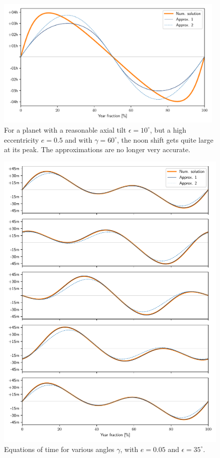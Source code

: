 \documentclass[12pt]{article}
\begin{document}
\begin{figure}[ht]
    \centering
    \includegraphics[width=0.98\textwidth]{./noon_computed_extreme.pdf}
    \caption{
        For a planet with a reasonable axial tilt $\epsilon=10^\circ$,
        but a high eccentricity $e=0.5$ and with $\gamma=60^\circ$, 
        the noon shift gets quite large at its peak. The approximations
        are no longer very accurate.
    }
    \label{fig:noon_computed_extreme}
\end{figure}

\begin{figure}
    \centering
    \includegraphics[width=\textwidth]{./noon_low_e.pdf}
    \caption{Equations of time for various angles $\gamma$, with 
        $e=0.05$ and $\epsilon=35^\circ$.
    }
    \label{fig:noon_low_e}
\end{figure}

\clearpage
\nocite{*}


\end{document}

